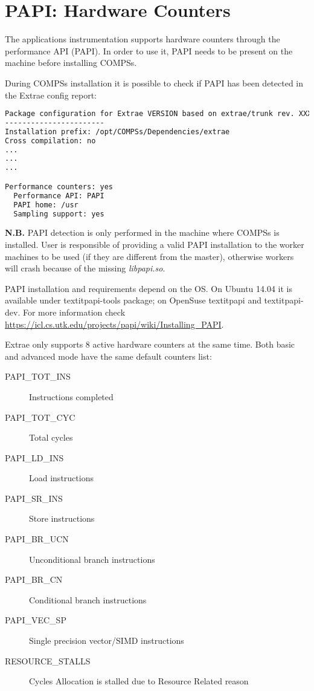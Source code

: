 \section{PAPI: Hardware Counters}
\label{sec:papi}

The applications instrumentation supports hardware counters through the performance API (PAPI). In order to use it, PAPI needs to be present on the machine before installing
COMPSs. 

During COMPSs installation it is possible to check if PAPI has been detected in the Extrae config report:

\begin{lstlisting}[language=bash]
Package configuration for Extrae VERSION based on extrae/trunk rev. XXXX:
-----------------------
Installation prefix: /opt/COMPSs/Dependencies/extrae
Cross compilation: no
...
...
...

Performance counters: yes
  Performance API: PAPI
  PAPI home: /usr
  Sampling support: yes
\end{lstlisting}

\textbf{N.B.} PAPI detection is only performed in the machine where COMPSs is installed. User is responsible of providing a valid PAPI installation to the worker machines to be used (if they are different from the master), otherwise workers will crash because of the missing \textit{libpapi.so}. 


PAPI installation and requirements depend on the OS. On Ubuntu 14.04 it is available under textit{papi-tools} package; on OpenSuse textit{papi} and textit{papi-dev}.
For more information check \url{https://icl.cs.utk.edu/projects/papi/wiki/Installing_PAPI}.


Extrae only supports 8 active hardware counters at the same time. Both basic and advanced mode have the same default counters list:

\begin{description}
 \item [PAPI\_TOT\_INS] Instructions completed
 \item [PAPI\_TOT\_CYC] Total cycles
 \item [PAPI\_LD\_INS] Load instructions
 \item [PAPI\_SR\_INS] Store instructions
 \item [PAPI\_BR\_UCN] Unconditional branch instructions
 \item [PAPI\_BR\_CN] Conditional branch instructions
 \item [PAPI\_VEC\_SP] Single precision vector/SIMD instructions
 \item [RESOURCE\_STALLS] Cycles Allocation is stalled due to Resource Related reason
\end{description}

